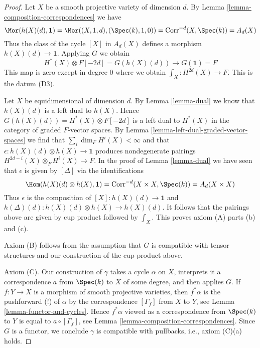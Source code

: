 \begin{proof}
\medskip\noindent
Let $X$ be a smooth projective variety of dimension $d$. By
Lemma \ref{lemma-composition-correspondences} we have
$$
\Mor(h(X)(d), \mathbf{1}) = \Mor((X, 1, d), (\Spec(k), 1, 0)) =
\text{Corr}^{-d}(X, \Spec(k)) = A_d(X)
$$
Thus the class of the cycle $[X]$ in $A_d(X)$ defines a morphism
$h(X)(d) \to \mathbf{1}$. Applying $G$ we obtain
$$
H^*(X) \otimes F[-2d] = G(h(X)(d)) \longrightarrow G(\mathbf{1}) = F
$$
This map is zero except in degree $0$ where we obtain
$\int_X : H^{2d}(X) \to F$. This is the datum (D3).

\medskip\noindent
Let $X$ be equidimensional of dimension $d$. By Lemma \ref{lemma-dual}
we know that $h(X)(d)$ is a left dual to $h(X)$. Hence
$G(h(X)(d)) = H^*(X) \otimes F[-2d]$ is a left dual to
$H^*(X)$ in the category of graded $F$-vector spaces.
By Lemma \ref{lemma-left-dual-graded-vector-spaces}
we find that $\sum_i \dim_F H^i(X) < \infty$ and that
$\epsilon : h(X)(d) \otimes h(X) \to \mathbf{1}$ produces
nondegenerate pairings $H^{2d - i}(X) \otimes_F H^i(X) \to F$.
In the proof of Lemma \ref{lemma-dual} we have seen that
$\epsilon$ is given by $[\Delta]$ via the identifications
$$
\Hom(h(X)(d) \otimes h(X), \mathbf{1}) =
\text{Corr}^{-d}(X \times X, \Spec(k)) =
A_d(X \times X)
$$
Thus $\epsilon$ is the composition of $[X] : h(X)(d) \to \mathbf{1}$
and $h(\Delta)(d) : h(X)(d) \otimes h(X) \to h(X)(d)$. It follows
that the pairings above are given by cup product followed by
$\int_X$. This proves axiom (A) parts (b) and (c).

\medskip\noindent
Axiom (B) follows from the assumption that $G$ is compatible
with tensor structures and our construction of the cup product above.

\medskip\noindent
Axiom (C). Our construction of $\gamma$ takes a cycle $\alpha$ on $X$,
interprets it a correspondence $a$ from $\Spec(k)$ to $X$ of some degree,
and then applies $G$. If $f : Y \to X$ is a morphism of smooth projective
varieties, then $f^*\alpha$ is the pushforward (!) of $\alpha$
by the correspondence $[\Gamma_f]$ from $X$ to $Y$, see
Lemma \ref{lemma-functor-and-cycles}. Hence
$f^*\alpha$ viewed as a correspondence from $\Spec(k)$ to $Y$
is equal to $a \circ [\Gamma_f]$, see
Lemma \ref{lemma-composition-correspondences}.
Since $G$ is a functor, we conclude
$\gamma$ is compatible with pullbacks, i.e., axiom (C)(a) holds.


\end{proof}
